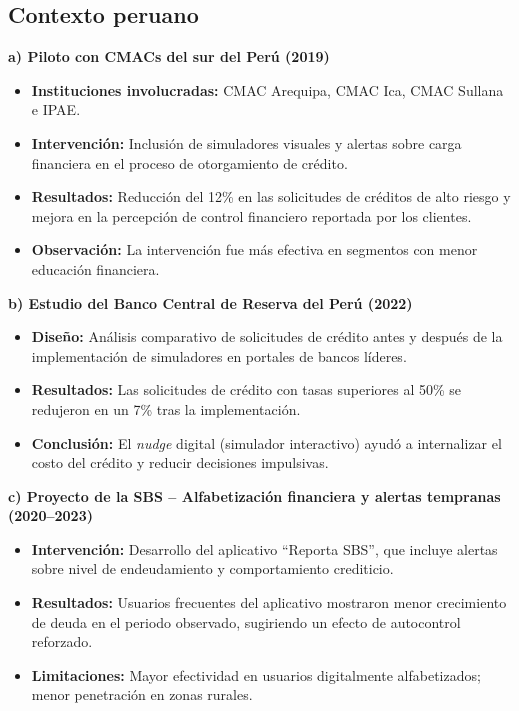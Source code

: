 \documentclass[10pt]{article}
\begin{document}
\begin{multicols}{2}
\subsection{Contexto peruano}

\textbf{a) Piloto con CMACs del sur del Perú (2019)}

\begin{itemize}
  \item \textbf{Instituciones involucradas:} CMAC Arequipa, CMAC Ica, CMAC Sullana e IPAE.
  \item \textbf{Intervención:} Inclusión de simuladores visuales y alertas sobre carga financiera en el proceso de otorgamiento de crédito.
  \item \textbf{Resultados:} Reducción del 12\% en las solicitudes de créditos de alto riesgo y mejora en la percepción de control financiero reportada por los clientes.
  \item \textbf{Observación:} La intervención fue más efectiva en segmentos con menor educación financiera.
\end{itemize}

\vspace{0.3cm}

\textbf{b) Estudio del Banco Central de Reserva del Perú (2022)}

\begin{itemize}
  \item \textbf{Diseño:} Análisis comparativo de solicitudes de crédito antes y después de la implementación de simuladores en portales de bancos líderes.
  \item \textbf{Resultados:} Las solicitudes de crédito con tasas superiores al 50\% se redujeron en un 7\% tras la implementación.
  \item \textbf{Conclusión:} El \textit{nudge} digital (simulador interactivo) ayudó a internalizar el costo del crédito y reducir decisiones impulsivas.
\end{itemize}

\vspace{0.3cm}

\textbf{c) Proyecto de la SBS – Alfabetización financiera y alertas tempranas (2020--2023)}

\begin{itemize}
  \item \textbf{Intervención:} Desarrollo del aplicativo ``Reporta SBS'', que incluye alertas sobre nivel de endeudamiento y comportamiento crediticio.
  \item \textbf{Resultados:} Usuarios frecuentes del aplicativo mostraron menor crecimiento de deuda en el periodo observado, sugiriendo un efecto de autocontrol reforzado.
  \item \textbf{Limitaciones:} Mayor efectividad en usuarios digitalmente alfabetizados; menor penetración en zonas rurales.
\end{itemize}



\end{multicols}
\end{document}
